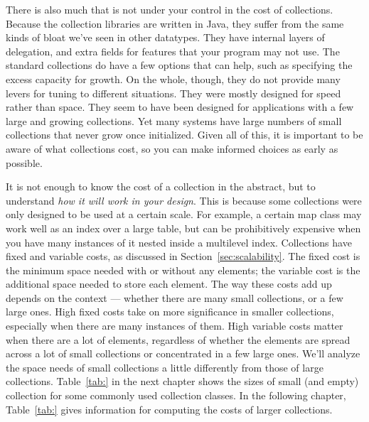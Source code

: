 There is also much that is not under your control in the cost
of collections.
Because the collection libraries are written in Java, they suffer
from the same kinds of bloat we've seen in other datatypes. They have
internal layers of delegation, and extra fields for features that your program may not use. The standard
collections do have a few options that can help, such as
specifying the excess capacity for growth. On the whole, though, they do not
provide many levers for tuning to different situations. They were mostly
designed for speed rather than space.  They seem to have been designed for
applications with a few large and growing collections. Yet many systems have large numbers
of small collections that never grow once initialized. Given all of this, it is important
to be aware of what collections cost, so you can make informed choices as early as possible. 

It is not enough to know the cost of a collection in the abstract, but to
understand \emph{how it will work in your design}. This is because some
collections were only designed to be used at a certain scale. 
For example, a certain map class may work
well as an index over a large table, but can be prohibitively expensive when you
have many instances of it nested inside a multilevel index. Collections have fixed and
variable costs, as discussed in Section~\ref{sec:scalability}. 
The fixed cost is the minimum space needed with or
without any elements; the variable cost is the additional space needed to
store each element. The way these costs add up
depends on the context ---
whether there are many small collections, or a few large ones. 
High fixed costs take on more significance in smaller collections,
especially when there are many instances of them. High variable costs matter
when there are a lot of elements, regardless of whether the elements are spread across
a lot of small collections or concentrated in a few large ones.
We'll analyze the space needs of small collections a little differently
from those of large collections. Table~\ref{tab:} in the next chapter shows the
sizes of small (and empty) collection for some commonly used collection classes. 
In the following chapter, Table~\ref{tab:} gives
information for computing the costs of larger collections.





